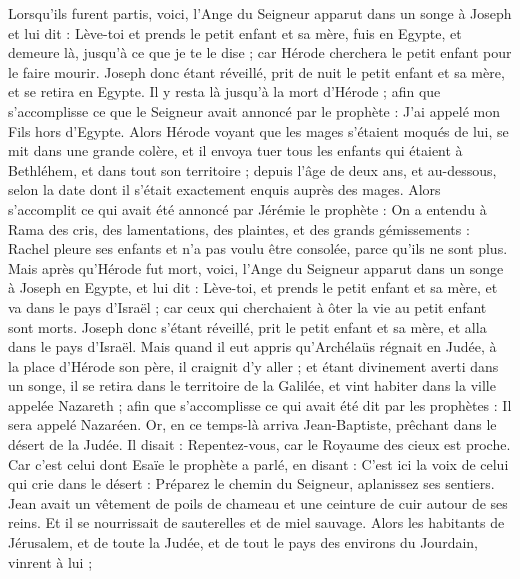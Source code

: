 \begin{multicols}{2}
Lorsqu'ils furent partis, voici, l'Ange du Seigneur apparut dans un songe à Joseph et lui dit : Lève-toi et prends le petit enfant et sa mère, fuis en Egypte, et demeure là, jusqu'à ce que je te le dise ; car Hérode cherchera le petit enfant pour le faire mourir.
Joseph donc étant réveillé, prit de nuit le petit enfant et sa mère, et se retira en Egypte.
Il y resta là jusqu'à la mort d'Hérode ; afin que s'accomplisse ce que le Seigneur avait annoncé par le prophète : J'ai appelé mon Fils hors d'Egypte.
Alors Hérode voyant que les mages s'étaient moqués de lui, se mit dans une grande colère, et il envoya tuer tous les enfants qui étaient à Bethléhem, et dans tout son territoire ; depuis l'âge de deux ans, et au-dessous, selon la date dont il s'était exactement enquis auprès des mages.
Alors s'accomplit ce qui avait été annoncé par Jérémie le prophète :
On a entendu à Rama des cris, des lamentations, des plaintes, et des grands gémissements : Rachel pleure ses enfants et n'a pas voulu être consolée, parce qu'ils ne sont plus.
Mais après qu'Hérode fut mort, voici, l'Ange du Seigneur apparut dans un songe à Joseph en Egypte,
et lui dit : Lève-toi, et prends le petit enfant et sa mère, et va dans le pays d'Israël ; car ceux qui cherchaient à ôter la vie au petit enfant sont morts.
Joseph donc s'étant réveillé, prit le petit enfant et sa mère, et alla dans le pays d'Israël.
Mais quand il eut appris qu'Archélaüs régnait en Judée, à la place d'Hérode son père, il craignit d'y aller ; et étant divinement averti dans un songe, il se retira dans le territoire de la Galilée,
et vint habiter dans la ville appelée Nazareth ; afin que s'accomplisse ce qui avait été dit par les prophètes : Il sera appelé Nazaréen.
\VerseOne{}Or, en ce temps-là arriva Jean-Baptiste, prêchant dans le désert de la Judée.
Il disait : Repentez-vous, car le Royaume des cieux est proche.
Car c'est celui dont Esaïe le prophète a parlé, en disant : C'est ici la voix de celui qui crie dans le désert : Préparez le chemin du Seigneur, aplanissez ses sentiers.
Jean avait un vêtement de poils de chameau et une ceinture de cuir autour de ses reins. Et il se nourrissait de sauterelles et de miel sauvage.
Alors les habitants de Jérusalem, et de toute la Judée, et de tout le pays des environs du Jourdain, vinrent à lui ;

\end{multicols}
